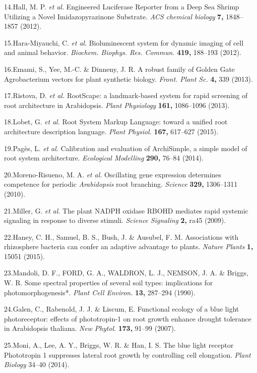 \documentclass[]{article}
\begin{document}
14.Hall, M. P. \emph{et al.} Engineered Luciferase Reporter from a Deep
Sea Shrimp Utilizing a Novel Imidazopyrazinone Substrate. \emph{ACS
chemical biology} \textbf{7,} 1848--1857 (2012).

15.Hara-Miyauchi, C. \emph{et al.} Bioluminescent system for dynamic
imaging of cell and animal behavior. \emph{Biochem. Biophys. Res.
Commun.} \textbf{419,} 188--193 (2012).

16.Emami, S., Yee, M.-C. \& Dinneny, J. R. A robust family of Golden
Gate Agrobacterium vectors for plant synthetic biology. \emph{Front.
Plant Sc.} \textbf{4,} 339 (2013).

17.Ristova, D. \emph{et al.} RootScape: a landmark-based system for
rapid screening of root architecture in Arabidopsis. \emph{Plant
Physiology} \textbf{161,} 1086--1096 (2013).

18.Lobet, G. \emph{et al.} Root System Markup Language: toward a unified
root architecture description language. \emph{Plant Physiol.}
\textbf{167,} 617--627 (2015).

19.Pag{è}s, L. \emph{et al.} Calibration and evaluation of ArchiSimple,
a simple model of root system architecture. \emph{Ecological Modelling}
\textbf{290,} 76--84 (2014).

20.Moreno-Risueno, M. A. \emph{et al.} Oscillating gene expression
determines competence for periodic \emph{Arabidopsis} root branching.
\emph{Science} \textbf{329,} 1306--1311 (2010).

21.Miller, G. \emph{et al.} The plant NADPH oxidase RBOHD mediates rapid
systemic signaling in response to diverse stimuli. \emph{Science
Signaling} \textbf{2,} ra45 (2009).

22.Haney, C. H., Samuel, B. S., Bush, J. \& Ausubel, F. M. Associations
with rhizosphere bacteria can confer an adaptive advantage to plants.
\emph{Nature Plants} \textbf{1,} 15051 (2015).

23.Mandoli, D. F., FORD, G. A., WALDRON, L. J., NEMSON, J. A. \& Briggs,
W. R. Some spectral properties of several soil types: implications for
photomorphogenesis*. \emph{Plant Cell Environ.} \textbf{13,} 287--294
(1990).

24.Galen, C., Rabenold, J. J. \& Liscum, E. Functional ecology of a blue
light photoreceptor: effects of phototropin-1 on root growth enhance
drought tolerance in Arabidopsis thaliana. \emph{New Phytol.}
\textbf{173,} 91--99 (2007).

25.Moni, A., Lee, A. Y., Briggs, W. R. \& Han, I. S. The blue light
receptor Phototropin 1 suppresses lateral root growth by controlling
cell elongation. \emph{Plant Biology} 34--40 (2014).
\end{document}
